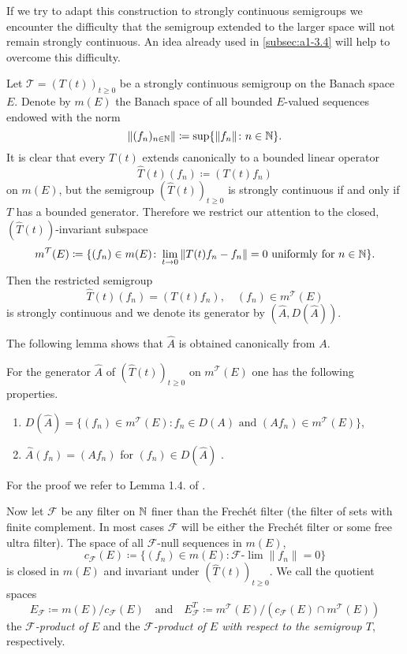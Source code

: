 If we try to adapt this construction to strongly continuous semigroups we encounter the difficulty that the semigroup extended to the larger space will not remain strongly continuous.
An idea already used in \ref{subsec:a1-3.4} will help to overcome this difficulty.

Let $\mathcal{T} = (T(t))_{t \geq 0}$ be a strongly continuous semigroup on the Banach space $E$.
Denote by $m(E)$ the Banach space of all bounded $E$-valued sequences endowed with the norm
\[
    \|(f_{n})_{n \in \mathbb{N}}\| \coloneqq \sup \{\|f_{n}\| \colon n \in \mathbb{N}\} .
\]
It is clear that every $T(t)$ extends canonically to a bounded linear operator
\[
    \hat{T}(t)(f_{n}) \coloneqq (T(t)f_{n})
\]
on $m(E)$, but the semigroup $(\hat{T}(t))_{t \geq 0}$ is strongly continuous if and only if $T$ has a bounded generator.
Therefore we restrict our attention to the closed, $(\hat{T}(t))$-invariant subspace
\[
    m^{\mathcal{T}}(E) \coloneqq \{(f_{n}) \in m(E) \colon \lim_{t \to 0} \|T(t)f_{n}-f_{n}\| = 0 \text{ uniformly for } n \in \mathbb{N}\} .
\]
Then the restricted semigroup
\[
    \hat{T}(t)(f_{n}) = (T(t)f_{n}), \quad (f_{n}) \in m^{\mathcal{T}}(E)
\]
is strongly continuous and we denote its generator by $(\hat{A},D(\hat{A}))$.

The following lemma shows that $\hat{A}$ is obtained canonically from $A$.
\begin{lemma*}\label{lem:a1-3.6}
For the generator $\hat{A}$ of $(\hat{T}(t))_{t \geq 0}$ on $m^{\mathcal{T}}(E)$ one has the following properties.
\begin{enumerate}[\upshape(i)]

\item 
$D(\hat{A}) = \{(f_{n}) \in m^{\mathcal{T}}(E) \colon f_{n} \in D(A) \text{ and } (Af_{n}) \in m^{\mathcal{T}}(E)\}$,

\item 
$\hat{A}(f_{n}) = (Af_{n})$ for $(f_{n}) \in D(\hat{A})$ .
\end{enumerate}

\end{lemma*}
For the proof we refer to Lemma 1.4. of \citet{derndinger:1980}.

Now let $\mathcal{F}$ be any filter on $\mathbb{N}$ finer than the Frechét filter (\ie the filter of sets with finite complement. In most cases $\mathcal{F}$ will be either the Frechét filter or some free ultra filter).
The space of all $\mathcal{F}$-null sequences in $m(E)$, \ie
\[
    c_{\mathcal{F}}(E) \coloneqq \{(f_{n}) \in m(E) \colon \mathcal{F}\text{-}\lim\|f_{n}\| = 0\}
\]
is closed in $m(E)$ and invariant under $(\hat{T}(t))_{t \geq 0}$. 
We call the quotient spaces
\[
    E_{\mathcal{F}} \coloneqq m(E)/c_{\mathcal{F}}(E) 
    \quad \text{and} \quad 
    E_{\mathcal{F}}^{T} \coloneqq m^{\mathcal{T}}(E)/ (c_{\mathcal{F}}(E)\cap m^{\mathcal{T}}(E))
\]
the \emph{$\mathcal{F}$-product of $E$} and the \emph{$ \mathcal{F} $-product of $E$ with respect to the semigroup $T$}, respectively.

